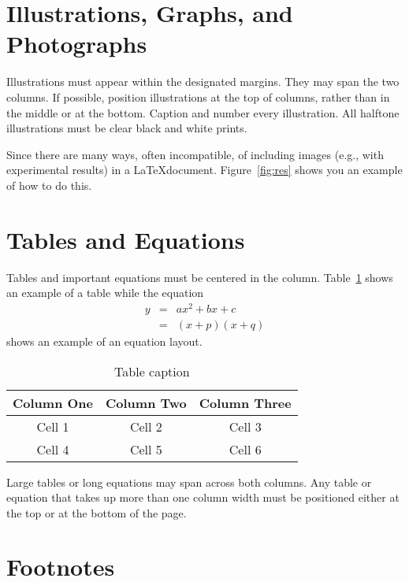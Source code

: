 \documentclass{article}
\begin{document}
\section{Illustrations, Graphs, and Photographs}
\label{sec:illust}

Illustrations must appear within the designated margins. They may span the two columns. If possible, position illustrations at the top of columns, rather than in the middle or at the bottom. Caption and number every illustration. All halftone illustrations must be clear black and white prints. 

Since there are many ways, often incompatible, of including images (e.g., with experimental results) in a \LaTeX document. Figure~\ref{fig:res} shows you an example of how to do this.

\section{Tables and Equations}

Tables and important equations must be centered in the column. Table~\ref{tab:cap} shows an example of a table while the equation
\begin{eqnarray}
y &=& ax^2+bx+c \nonumber \\
~ &=& (x+p)(x+q)
\end{eqnarray}
shows an example of an equation layout.

\begin{table}[t]
\begin{center}
\caption{Table caption} \label{tab:cap}
\begin{tabular}{|c|c|c|}
  \hline
  Column One & Column Two & Column Three
  \\
  \hline
  Cell 1 & Cell 2 & Cell 3 \\
  Cell 4 & Cell 5 & Cell 6 \\
  \hline
\end{tabular}
\end{center}
\end{table}

Large tables or long equations may span across both columns. Any table or equation that takes up more than one column width must be positioned either at the top or at the bottom of the page.

\section{Footnotes}
\end{document}

